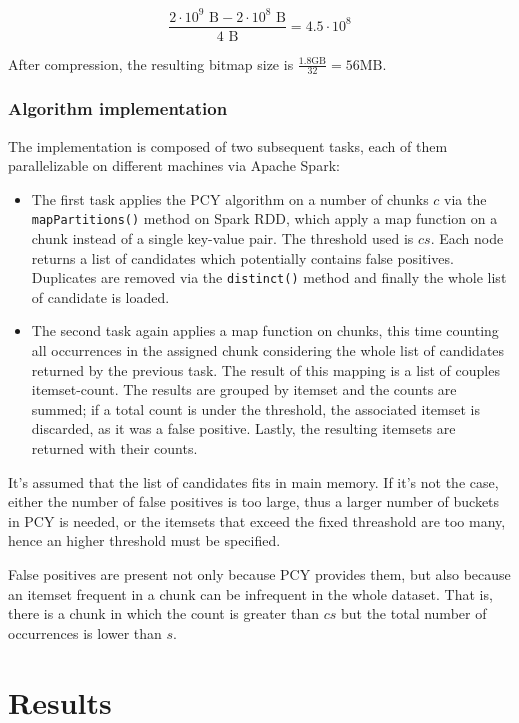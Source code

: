 \documentclass{article}
\begin{document}
\begin{equation}
	\frac{2 \cdot 10^9 \text{ B} - 2 \cdot 10^8 \text{ B}}{4 \text{ B}} = 4.5 \cdot 10^8
\end{equation}

After compression, the resulting bitmap size is $\frac{1.8 \text{GB} }{32} = 56 \text{MB}$.

\subsubsection{Algorithm implementation}

The implementation is composed of two subsequent tasks, each of them parallelizable on different machines via Apache Spark:
\begin{itemize}
	\item The first task applies the PCY algorithm on a number of chunks $c$ via the \texttt{mapPartitions()} method on Spark RDD, which apply a map function on a chunk instead of a single key-value pair. The threshold used is $cs$. Each node returns a list of candidates which potentially contains false positives. Duplicates are removed via the \texttt{distinct()} method and finally the whole list of candidate is loaded.
	\item The second task again applies a map function on chunks, this time counting all occurrences in the assigned chunk considering the whole list of candidates returned by the previous task. The result of this mapping is a list of couples itemset-count.  The results are grouped by itemset and the counts are summed; if a total count is under the threshold, the associated itemset is discarded, as it was a false positive. Lastly, the resulting itemsets are returned with their counts.
\end{itemize}

It's assumed that the list of candidates fits in main memory. If it's not the case, either the number of false positives is too large, thus a larger number of buckets in PCY is needed, or the itemsets that exceed the fixed threashold are too many, hence an higher threshold must be specified.

False positives are present not only because PCY provides them, but also because an itemset frequent in a chunk can be infrequent in the whole dataset. That is, there is a chunk in which the count is greater than $cs$ but the total number of occurrences is lower than $s$.

\section{Results}
\end{document}
